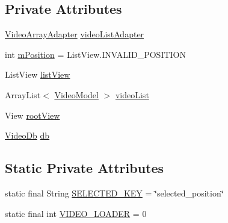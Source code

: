 \subsection*{Private Attributes}
\begin{DoxyCompactItemize}
\item 
\hyperlink{classorg_1_1buildmlearn_1_1toolkit_1_1videocollectiontemplate_1_1adapter_1_1VideoArrayAdapter}{Video\+Array\+Adapter} \hyperlink{classorg_1_1buildmlearn_1_1toolkit_1_1videocollectiontemplate_1_1fragment_1_1MainActivityFragment_a37e843e77a3b805f2f696c3353fe3296}{video\+List\+Adapter}
\item 
int \hyperlink{classorg_1_1buildmlearn_1_1toolkit_1_1videocollectiontemplate_1_1fragment_1_1MainActivityFragment_acb7eb080b5964465e02a883aa5ef05da}{m\+Position} = List\+View.\+I\+N\+V\+A\+L\+I\+D\+\_\+\+P\+O\+S\+I\+T\+I\+ON
\item 
List\+View \hyperlink{classorg_1_1buildmlearn_1_1toolkit_1_1videocollectiontemplate_1_1fragment_1_1MainActivityFragment_aa62e9c1de09632b264472a08c984f28b}{list\+View}
\item 
Array\+List$<$ \hyperlink{classorg_1_1buildmlearn_1_1toolkit_1_1videocollectiontemplate_1_1data_1_1VideoModel}{Video\+Model} $>$ \hyperlink{classorg_1_1buildmlearn_1_1toolkit_1_1videocollectiontemplate_1_1fragment_1_1MainActivityFragment_a2e22394adf697de7987441b919a89671}{video\+List}
\item 
View \hyperlink{classorg_1_1buildmlearn_1_1toolkit_1_1videocollectiontemplate_1_1fragment_1_1MainActivityFragment_acce46f948c415711ad0639982ebcaa06}{root\+View}
\item 
\hyperlink{classorg_1_1buildmlearn_1_1toolkit_1_1videocollectiontemplate_1_1data_1_1VideoDb}{Video\+Db} \hyperlink{classorg_1_1buildmlearn_1_1toolkit_1_1videocollectiontemplate_1_1fragment_1_1MainActivityFragment_adcd8c029382165242baf809a8a65c319}{db}
\end{DoxyCompactItemize}
\subsection*{Static Private Attributes}
\begin{DoxyCompactItemize}
\item 
static final String \hyperlink{classorg_1_1buildmlearn_1_1toolkit_1_1videocollectiontemplate_1_1fragment_1_1MainActivityFragment_a62b39b0a79d802d565d7c438c37fd441}{S\+E\+L\+E\+C\+T\+E\+D\+\_\+\+K\+EY} = \char`\"{}selected\+\_\+position\char`\"{}
\item 
static final int \hyperlink{classorg_1_1buildmlearn_1_1toolkit_1_1videocollectiontemplate_1_1fragment_1_1MainActivityFragment_ad20cbd7e19c6b2f861a0ebdb5f410762}{V\+I\+D\+E\+O\+\_\+\+L\+O\+A\+D\+ER} = 0
\end{DoxyCompactItemize}


